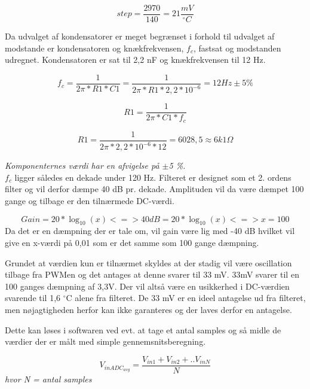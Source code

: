 \begin{equation}
step = \frac{2970}{140} = 21 \frac{mV}{^{\circ}C}
\end{equation}

Da udvalget af kondensatorer er meget begrænset i forhold til udvalget af modstande er kondensatoren og knækfrekvensen, $f_c$, fastsat og modstanden udregnet. Kondensatoren er sat til 2,2 nF og knækfrekvensen til 12 Hz. 

\begin{equation}
f_c = \frac{1}{2 \pi * R1 * C1} = \frac{1}{2 \pi * R1  * 2,2*10^{-6}} = 12 Hz\pm5 \%
\end{equation}

\begin{equation}
R1 = \frac{1}{2 \pi * C1  * f_c}
\end{equation}

\begin{equation}
R1 = \frac{1}{2 \pi * 2,2*10^{-6}  * 12} = 6028,5 \approx 6k1\Omega 
\end{equation}

\textit{Komponenternes værdi har en afvigelse på $\pm$5 \%.}\\

$f_c$ ligger således en dekade under 120 Hz. Filteret er designet som et 2. ordens filter og vil derfor dæmpe 40 dB pr. dekade. Amplituden vil da være dæmpet 100 gange og tilbage er den tilnærmede DC-værdi. 

\begin{equation}
Gain = 20 * \log_{10}(x) <=> 40 dB = 20 * \log_ {10}(x) <=> x = 100
\end{equation} 
Da det er en dæmpning der er tale om, vil gain være lig med -40 dB hvilket vil give en x-værdi på 0,01 som er det samme som 100 gange dæmpning.

Grundet at værdien kun er tilnærmet skyldes at der stadig vil være oscillation tilbage fra PWMen og det antages at denne svarer til 33 mV. 33mV svarer til en 100 ganges dæmpning af 3,3V. Der vil altså være en usikkerhed i DC-værdien svarende til 1,6 $^{\circ}$C alene fra filteret. De 33 mV er en ideel antagelse ud fra filteret, men nøjagtigheden herfor kan ikke garanteres og der laves derfor en antagelse.

Dette kan løses i softwaren ved evt. at tage et antal samples og så midle de værdier der er målt med simple gennemsnitsberegning. 

\begin{equation}
V_{inADC_{avg}} = \frac{V_{in1} + V_{in2} + .. V_{inN}}{N}
\end{equation} 
\textit{hvor N = antal samples}

